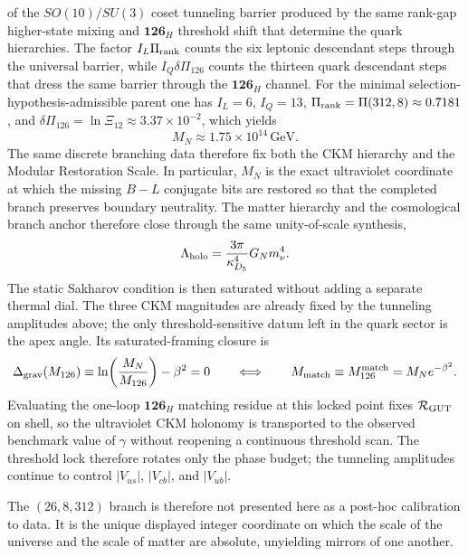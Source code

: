 \documentclass[11pt]{article}
\begin{document}
of the $SO(10)/SU(3)$ coset tunneling barrier produced by the same rank-gap
higher-state mixing and $\mathbf{126}_H$ threshold shift that determine the
quark hierarchies. The factor $I_L\Pi_{\rm rank}$ counts the six leptonic
descendant steps through the universal barrier, while
$I_Q\delta\Pi_{126}$ counts the thirteen quark descendant steps that dress the
same barrier through the $\mathbf{126}_H$ channel. For the
minimal selection-hypothesis-admissible parent one has $I_L=6$, $I_Q=13$,
$\Pi_{\rm rank}=\Pi(312,8)\approx0.7181$, and
$\delta\Pi_{126}=\ln\Xi_{12}\approx3.37\times10^{-2}$, which yields
\begin{equation}
 M_N\approx1.75\times10^{14}\,\mathrm{GeV}.
\end{equation}
The same discrete branching data therefore fix both the CKM hierarchy and the
Modular Restoration Scale. In particular, $M_N$ is the exact ultraviolet
coordinate at which the missing $B-L$ conjugate bits are restored so that the
completed branch preserves boundary neutrality. The matter hierarchy and the
cosmological branch anchor therefore close through the same unity-of-scale
synthesis,
\begin{equation}
 \label{eq:mass-hierarchy-unity-of-scale}
 \Lambda_{\rm holo}
 =
 \frac{3\pi}{\kappa_{D_5}^4}
 G_N m_{\nu}^4.
\end{equation}
The static Sakharov condition is then saturated without adding a separate
thermal dial. The three CKM magnitudes are already fixed by the
tunneling amplitudes above; the only threshold-sensitive datum left in the
quark sector is the apex angle. Its saturated-framing closure is
\begin{equation}
 \Delta_{\rm grav}(M_{126})
 \equiv
 \ln\!\left(\frac{M_N}{M_{126}}\right)-\beta^2=0
 \qquad\Longleftrightarrow\qquad
 M_{\rm match}\equiv M_{126}^{\rm match}=M_Ne^{-\beta^2}.
\end{equation}
Evaluating the one-loop $\mathbf{126}_H$ matching residue at this locked point
fixes $\mathcal R_{\rm GUT}$ on shell, so the ultraviolet CKM holonomy is
transported to the observed benchmark value of $\gamma$ without reopening a
continuous threshold scan. The threshold lock therefore rotates only the phase
budget; the tunneling amplitudes continue to control $|V_{us}|$, $|V_{cb}|$,
and $|V_{ub}|$.

The $(26,8,312)$ branch is therefore not presented here as a post-hoc calibration to
data. It is the unique displayed integer coordinate on which the scale of the
universe and the scale of matter are absolute, unyielding mirrors of one
another.
\end{document}
